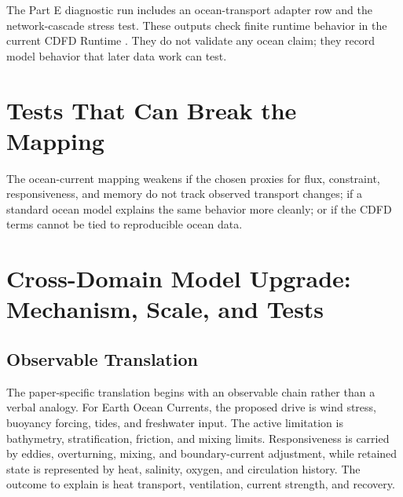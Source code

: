 \documentclass[12pt,a4paper]{article}
\begin{document}
The Part E diagnostic run includes an ocean-transport adapter row and the
network-cascade stress test. These outputs check finite runtime behavior in
the current CDFD Runtime \cite{CDFDRuntime2026}. They do not validate any ocean
claim; they record model behavior that later data work can test.

\section{Tests That Can Break the Mapping}

The ocean-current mapping weakens if the chosen proxies for flux, constraint,
responsiveness, and memory do not track observed transport changes; if a
standard ocean model explains the same behavior more cleanly; or if the CDFD
terms cannot be tied to reproducible ocean data.

\section{Cross-Domain Model Upgrade: Mechanism, Scale, and Tests}

\subsection{Observable Translation}

The paper-specific translation begins with an observable chain rather than a
verbal analogy. For Earth Ocean Currents, the proposed drive is wind stress, buoyancy forcing, tides, and freshwater input.
The active limitation is bathymetry, stratification, friction, and mixing limits. Responsiveness is carried by
eddies, overturning, mixing, and boundary-current adjustment, while retained state is represented by
heat, salinity, oxygen, and circulation history. The outcome to explain is heat transport, ventilation, current strength, and recovery.
\end{document}
